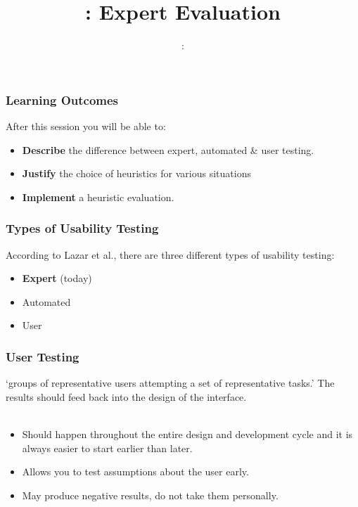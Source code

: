 \usepackage{../../beamerthemeFalmouthGamesAcademy}
\usepackage{multimedia}
\graphicspath{ {../../} }


\usepackage[normalem]{ulem}
\usepackage{wasysym}
\usepackage{gensymb}
\usepackage{pdfpages}
\usepackage{verbatim}


\usetikzlibrary{arrows,automata}




\title{\sessionnumber: Expert Evaluation}
\subtitle{\modulecode: \moduletitle}

\frame{\titlepage} 

\begin{frame}
	\frametitle{Learning Outcomes}
	After this session you will be able to:

	\begin{itemize}
		\item \textbf{Describe} the difference between expert, automated \& user testing.
		\item \textbf{Justify} the choice of heuristics for various situations
		\item \textbf{Implement} a heuristic evaluation.
	\end{itemize}
\end{frame}

\begin{frame}
	\frametitle{Types of Usability Testing}
	
	According to Lazar et al., there are three different types of usability testing:

	\begin{itemize}
		\item \textbf{Expert} (today) 
		\item Automated 
		\item User
	\end{itemize}
\end{frame}

\begin{frame}
	\frametitle{User Testing}
	
	`groups of representative users attempting a set of representative tasks.' The results should feed back into the design of the interface. \\~\\
	
	\begin{itemize}
		\item Should happen throughout the entire design and development cycle and it is always easier to start earlier than later.
		\item Allows you to test assumptions about the user early. 
		\item May produce negative results, do not take them personally. 
	\end{itemize}
\end{frame}

